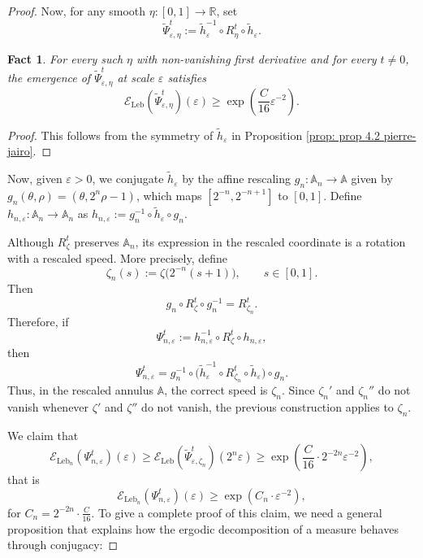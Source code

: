 \documentclass[11pt,reqno]{amsart}
\theoremstyle{plain}
\newtheorem{fact}[theorem]{Fact}
\theoremstyle{definition}
\theoremstyle{remark}
\theoremstyle{plain}
\numberwithin{equation}{section}
\newcommand{\R}{\mathbb{R}}
\newcommand{\A}{\mathbb{A}}
\newcommand{\eps}{\varepsilon}
\begin{document}
\begin{proof}
Now, for any smooth $\eta:[0,1]\to\R$, set
\[
        \tilde\Psi^t_{\eps,\eta}
        :=
        \tilde h_\eps^{-1}\circ R_\eta^t\circ \tilde h_\eps.
\]

\begin{fact}
For every such $\eta$ with non-vanishing first derivative and for every
$t\neq0$, the emergence of $\tilde\Psi^t_{\eps,\eta}$ at scale $\eps$ satisfies
\[
        \mathcal E_{\mathrm{Leb}}(\tilde\Psi^t_{\eps,\eta})(\eps)
        \geq
        \exp\left(\frac{C}{16}\eps^{-2}\right).
\]
\end{fact}

\begin{proof}
	This follows from the symmetry of $\tilde{h}_{\eps}$ in Proposition \ref{prop: prop 4.2 pierre-jairo}.
\end{proof}

Now, given $\eps>0$, we conjugate $\tilde h_{\eps}$ by the affine rescaling
$g_{n}\colon \mathbb A_{n}\to \mathbb A$ given by $g_{n}(\theta,\rho)=(\theta,2^{n}\rho-1)$, which maps $[2^{-n},2^{-n+1}]$ to $[0,1]$. Define $h_{n,\eps}\colon \A_{n}\to \A_{n}$ as $h_{n,\eps}:=g_{n}^{-1}\circ \tilde h_{\eps}\circ g_{n}$.

Although $R_{\zeta}^{t}$ preserves $\mathbb A_{n}$, its expression in the
rescaled coordinate is a rotation with a rescaled speed. More precisely,
define
\begin{equation*}
\zeta_{n}(s):=\zeta\bigl(2^{-n}(s+1)\bigr),
\qquad s\in[0,1].
\end{equation*}
Then
\begin{equation*}
g_{n}\circ R_{\zeta}^{t}\circ g_{n}^{-1}
=
R_{\zeta_{n}}^{t}.
\end{equation*}
Therefore, if
\begin{equation*}
\Psi_{n,\eps}^{t}:=h_{n,\eps}^{-1}\circ R_{\zeta}^{t}\circ h_{n,\eps},
\end{equation*}
then
\begin{equation*}
\Psi_{n,\eps}^{t}
=
g_{n}^{-1}\circ
\bigl(\tilde h_{\eps}^{-1}\circ R_{\zeta_{n}}^{t}\circ \tilde h_{\eps}\bigr)
\circ g_{n}.
\end{equation*}
Thus, in the rescaled annulus $\mathbb A$, the correct speed is $\zeta_n$.
Since $\zeta_{n}'$ and $\zeta_{n}''$ do not vanish whenever $\zeta'$ and
$\zeta''$ do not vanish, the previous construction applies to $\zeta_n$.


We claim that 
$$\mathcal{E}_{\mathrm{Leb}_{n}}(\Psi^{t}_{n,\eps})(\eps)\geq \mathcal{E}_{\mathrm{Leb}}(\tilde{\Psi}^{t}_{\eps,\zeta_n})(2^{n}\eps)\geq \exp\left(\frac{C}{16}\cdot  2^{-2n}\eps^{-2}\right),$$ that is 
$$\mathcal{E}_{\mathrm{Leb}_{n}}(\Psi^{t}_{n,\eps})(\eps)\geq \exp(C_{n}\cdot  \eps^{-2}),$$ for $C_{n}=2^{-2n}\cdot \frac{C}{16}$. To give a complete proof of this claim, we need a general proposition that explains how the ergodic decomposition of a measure behaves through conjugacy:


\end{proof}
\end{document}
